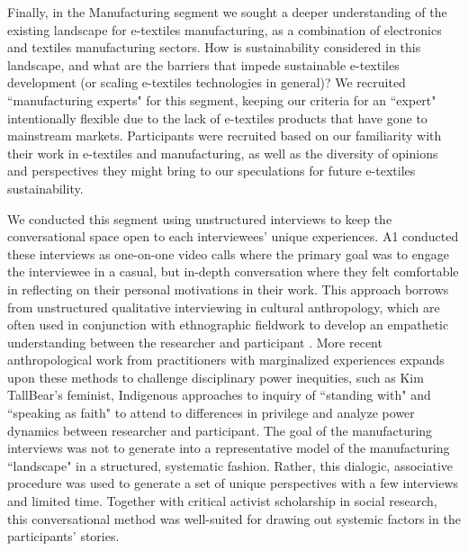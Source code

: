 Finally, in the Manufacturing segment we sought a deeper understanding of the existing landscape for e-textiles manufacturing, as a combination of electronics and textiles manufacturing sectors. How is sustainability considered in this landscape, and what are the barriers that impede sustainable e-textiles development (or scaling e-textiles technologies in general)? We recruited ``manufacturing experts" for this segment, keeping our criteria for an ``expert" intentionally flexible due to the lack of e-textiles products that have gone to mainstream markets. Participants were recruited based on our familiarity with their work in e-textiles and manufacturing, as well as the diversity of opinions and perspectives they might bring to our speculations for future e-textiles sustainability.

We conducted this segment using unstructured interviews to keep the conversational space open to each interviewees' unique experiences. A1 conducted these interviews as one-on-one video calls where the primary goal was to engage the interviewee in a casual, but in-depth conversation where they felt comfortable in reflecting on their personal motivations in their work. This approach borrows from unstructured qualitative interviewing in cultural anthropology, which are often used in conjunction with ethnographic fieldwork to develop an empathetic understanding between the researcher and participant \cite{fontana_interviewing_2007, gburgess_unstructured_1982}. More recent anthropological work from practitioners with marginalized experiences expands upon these methods to challenge disciplinary power inequities, such as Kim TallBear's feminist, Indigenous approaches to inquiry of ``standing with" and ``speaking as faith" \cite{tallbear_standing_2014} to attend to differences in privilege and analyze power dynamics between researcher and participant. 
The goal of the manufacturing interviews was not to generate into a representative model of the manufacturing ``landscape" in a structured, systematic fashion. Rather, this dialogic, associative procedure was used to generate a set of unique perspectives with a few interviews and limited time. Together with critical activist scholarship in social research, this conversational method was well-suited for drawing out systemic factors in the participants' stories.

